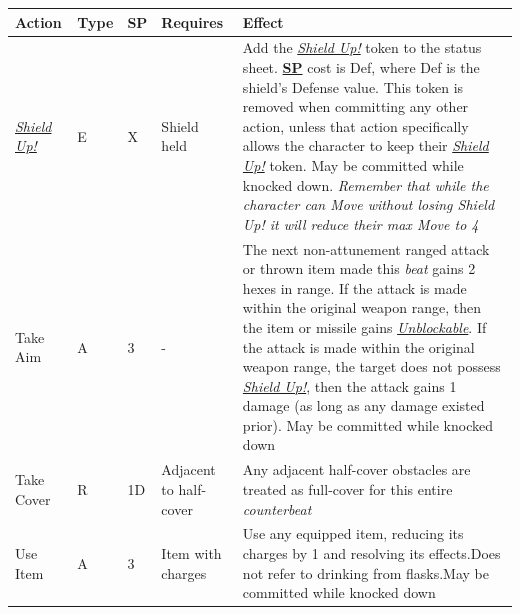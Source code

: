 \documentclass[12pt]{article}
\newcommand{\refto}[1]{\hyperlink{#1}{\textbf{#1}}}
\newcommand{\reftoit}[1]{\hyperlink{#1}{\emph{#1}}}
\begin{document}
\pagebreak

\begin{center}
\begin{tabularx}{\textwidth}{p{}p{}p{}p{}p{}}
\hline
\rowcolor{white} \textbf{Action} & \textbf{Type} & \textbf{SP} & \textbf{Requires} & \textbf{Effect}\setcounter{rownum}{0}\\
\hline
\reftoit{Shield Up!} & E & X & Shield held & Add the \reftoit{Shield Up!} token to the status sheet.\newline
\refto{SP} cost is Def, where Def is the shield’s Defense value.\newline
This token is removed when committing any other action, unless that action specifically allows the character to keep their \reftoit{Shield Up!} token.\newline
May be committed while knocked down.\newline
\emph{Remember that while the character can Move without losing Shield Up! it will reduce their max Move to 4}\\
Take Aim & A & 3 & - & The next non-attunement ranged attack or thrown item made this \emph{beat} gains 2 hexes in range.\newline
If the attack is made within the original weapon range, then the item or missile gains \reftoit{Unblockable}.\newline
If the attack is made within the original weapon range, the target does not possess \reftoit{Shield Up!}, then the attack gains 1 damage (as long as any damage existed prior).\newline
May be committed while knocked down\\
Take Cover & R & 1D & Adjacent to half-cover & Any adjacent half-cover obstacles are treated as full-cover for this entire \emph{counterbeat}\\
Use Item & A & 3 & Item with charges & Use any equipped item, reducing its charges by 1 and resolving its effects.\newline Does not refer to drinking from flasks.\newline May be committed while knocked down\\
\hline
\end{tabularx}
\end{center}

\pagebreak
\end{document}
